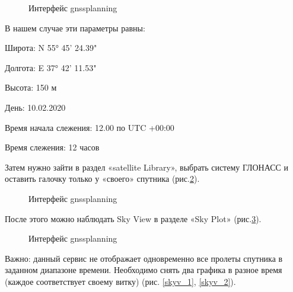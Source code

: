 \documentclass[]{article}
\begin{document}
 	\begin{figure}[h!]
 	
 	\caption{Интерфейс gnssplanning }
 	\label{gnss}
 \end{figure}




В нашем случае эти параметры равны:

Широта: N 55° 45' 24.39"

Долгота: E 37° 42' 11.53"

Высота: 150 м

День: 10.02.2020

Время начала слежения: 12.00 по UTC +00:00

Время слежения: 12 часов

Затем нужно зайти в раздел «satellite Library», выбрать систему ГЛОНАСС и оставить галочку только у «своего» спутника (рис.\ref{gnss_2}). 
 
 \begin{figure}[h!]
 	
 	\caption{Интерфейс gnssplanning }
 	\label{gnss_2}
 \end{figure}
 После этого можно наблюдать Sky View в разделе «Sky Plot» (рис.\ref{gnss_3}).
 
 \begin{figure}[h!]
 	
 	\caption{Интерфейс gnssplanning }
 	\label{gnss_3}
 \end{figure}
 Важно: данный сервис не отображает одновременно все пролеты спутника в заданном диапазоне времени.  Необходимо снять два графика в разное время (каждое соответствует своему витку) (рис. \ref{skyv_1}, \ref{skyv_2}).
 
\end{document}
